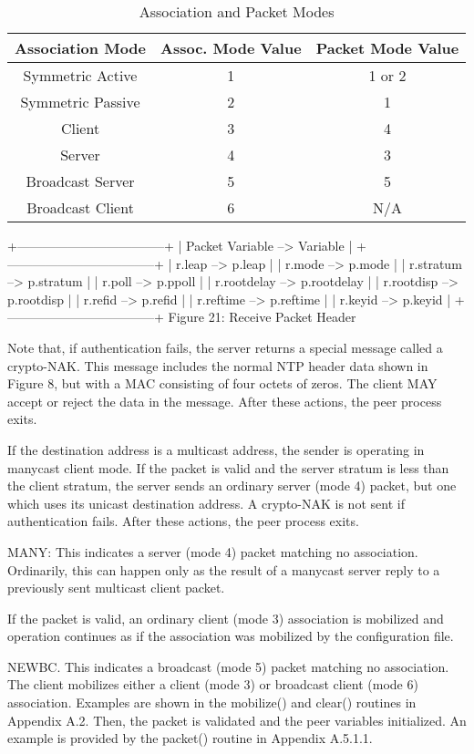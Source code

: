 \begin{table}[htb]
\center
\begin{tabular}{c | c | c}
Association Mode & Assoc. Mode Value & Packet Mode Value \\
\hline
\hline
Symmetric Active & 1 & 1 or 2 \\
Symmetric Passive & 2 & 1 \\
Client & 3 & 4 \\
Server & 4 & 3 \\
Broadcast Server & 5 & 5 \\
Broadcast Client & 6 & N/A \\
\hline
\end{tabular}
\label{association_and_packet_modes}
\caption{Association and Packet Modes}
\end{table}

+-----------------------------------+
| Packet Variable --> Variable |
+-----------------------------------+
| r.leap --> p.leap |
| r.mode --> p.mode |
| r.stratum --> p.stratum |
| r.poll --> p.ppoll |
| r.rootdelay --> p.rootdelay |
| r.rootdisp --> p.rootdisp |
| r.refid --> p.refid |
| r.reftime --> p.reftime |
| r.keyid --> p.keyid |
+-----------------------------------+
Figure 21: Receive Packet Header

Note that, if authentication fails, the server returns a special
message called a crypto-NAK. This message includes the normal NTP
header data shown in Figure 8, but with a MAC consisting of four
octets of zeros. The client MAY accept or reject the data in the
message. After these actions, the peer process exits.

If the destination address is a multicast address, the sender is
operating in manycast client mode. If the packet is valid and the
server stratum is less than the client stratum, the server sends an
ordinary server (mode 4) packet, but one which uses its unicast
destination address. A crypto-NAK is not sent if authentication
fails. After these actions, the peer process exits.

MANY: This indicates a server (mode 4) packet matching no
association. Ordinarily, this can happen only as the result of a
manycast server reply to a previously sent multicast client packet.

If the packet is valid, an ordinary client (mode 3) association is
mobilized and operation continues as if the association was mobilized
by the configuration file.

NEWBC. This indicates a broadcast (mode 5) packet matching no
association. The client mobilizes either a client (mode 3) or
broadcast client (mode 6) association. Examples are shown in the
mobilize() and clear() routines in Appendix A.2. Then, the packet is
validated and the peer variables initialized. An example is provided
by the packet() routine in Appendix A.5.1.1.

